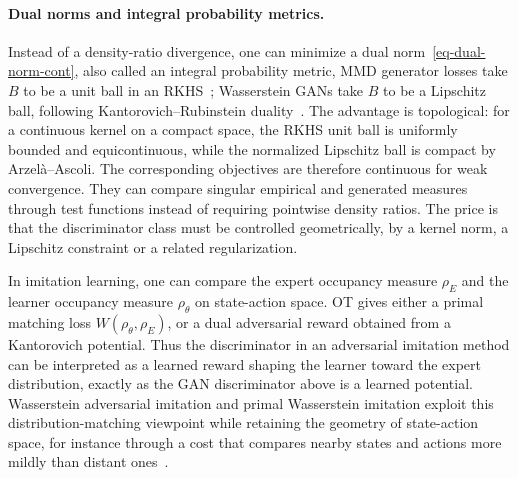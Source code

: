 \paragraph{Dual norms and integral probability metrics.}

Instead of a density-ratio divergence, one can minimize a dual norm~\eqref{eq-dual-norm-cont}, also called an integral probability metric,
MMD generator losses take $B$ to be a unit ball in an RKHS~\cite{MMD-GAN}; Wasserstein GANs take $B$ to be a Lipschitz ball, following Kantorovich--Rubinstein duality~\cite{WassersteinGAN}. The advantage is topological: for a continuous kernel on a compact space, the RKHS unit ball is uniformly bounded and equicontinuous, while the normalized Lipschitz ball is compact by Arzel\`a--Ascoli. The corresponding objectives are therefore continuous for weak convergence. They can compare singular empirical and generated measures through test functions instead of requiring pointwise density ratios. The price is that the discriminator class must be controlled geometrically, by a kernel norm, a Lipschitz constraint or a related regularization.
%

\begin{example}\label{ex-imitation-learning-ot}
	In imitation learning, one can compare the expert occupancy measure \(\rho_E\) and the learner occupancy measure \(\rho_\theta\) on state-action space. OT gives either a primal matching loss \(W(\rho_\theta,\rho_E)\), or a dual adversarial reward obtained from a Kantorovich potential. Thus the discriminator in an adversarial imitation method can be interpreted as a learned reward shaping the learner toward the expert distribution, exactly as the GAN discriminator above is a learned potential. Wasserstein adversarial imitation and primal Wasserstein imitation exploit this distribution-matching viewpoint while retaining the geometry of state-action space, for instance through a cost that compares nearby states and actions more mildly than distant ones~\cite{XiaoHermanWagnerZiescheEtesamiLinh2019WAIL,DadashiHussenotGeistPietquin2020PWIL}.
\end{example}

